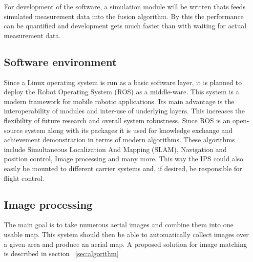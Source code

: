 \documentclass[fontsize=11pt,paper=a4,]{scrartcl}
\begin{document}
For development of the software, a simulation module will be written thats feeds simulated measurement data into the fusion algorithm.
By this the performance can be quantified and development gets much faster than with waiting for actual measurement data. 


\FloatBarrier
\subsection{Software environment}
Since a Linux operating system is run as a basic software layer, it is planned to deploy the Robot Operating System (ROS) as a middle-ware. This system is a modern framework
for mobile robotic applications. Its main advantage is the interoperability of modules and inter-use of underlying 
layers. This increases the flexibility of future research and overall system robustness. Since ROS is an open-source system along with its packages it is used for knowledge exchange and achievement demonstration in terms of modern algorithms. These algorithms include Simultaneous Localization
And Mapping (SLAM), Navigation and position control, Image processing and many more. This way the IPS could also easily be mounted to different carrier systems and, if desired, be responsible for flight control.

\subsection{Image processing}
The main goal is to take numerous aerial images and combine them into one usable map. This system should then be able
to automatically collect images over a given area and produce an aerial map. A proposed solution
for image matching is described in section ~\ref{sec:algorithm}
\end{document}

